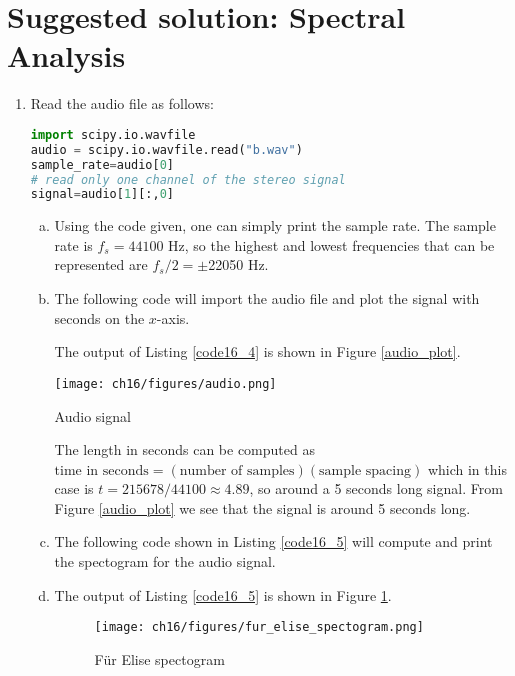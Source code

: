 \newpage
\section{Suggested solution: Spectral Analysis}

\begin{enumerate}
\item Read the audio file as follows:
\begin{lstlisting}[language=Python]
import scipy.io.wavfile
audio = scipy.io.wavfile.read("b.wav")
sample_rate=audio[0]
# read only one channel of the stereo signal
signal=audio[1][:,0]
\end{lstlisting}

\begin{enumerate}[a)]
\item Using the code given, one can simply print the sample rate. The sample rate is $f_s=44100$ Hz, so the highest and lowest frequencies that can be represented are $f_{s}/2=\pm$22050 Hz.

\item The following code will import the audio file and plot the signal with seconds on the $x$-axis. 


The output of Listing \ref{code16_4} is shown in Figure \ref{audio_plot}.
\begin{marginfigure}
    \centering
    \texttt{[image: ch16/figures/audio.png]}
    \caption{Audio signal}
    \label{audio_plot}
\end{marginfigure}
The length in seconds can be computed as $\text{time in seconds}=(\text{number of samples})(\text{sample spacing})$ which in this case is $t=215678/44100\approx 4.89$, so around a 5 seconds long signal. From Figure \ref{audio_plot} we see that the signal is around 5 seconds long. 

\item The following code shown in Listing \ref{code16_5} will compute and print the spectogram for the audio signal. 



\item The output of Listing \ref{code16_5} is shown in Figure \ref{fur_elise_spectogram}.
\begin{figure}[h!]
    \centering
    \texttt{[image: ch16/figures/fur\_elise\_spectogram.png]}
    \caption{Für Elise spectogram}
    \label{fur_elise_spectogram}
\end{figure}


\end{enumerate}
\end{enumerate}
